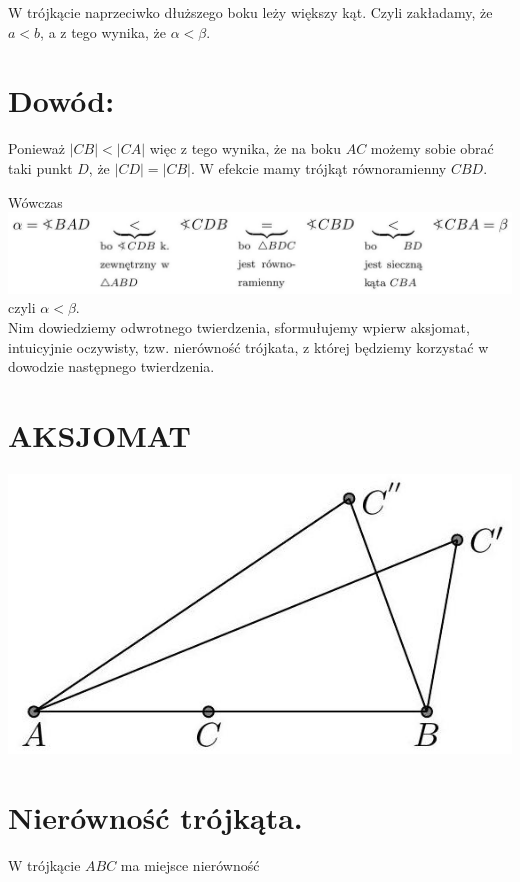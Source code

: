 \documentclass[10pt]{article}
\begin{document}
W trójkącie naprzeciwko dłuższego boku leży większy kąt. Czyli zakładamy, że \(a<b\), a z tego wynika, że \(\alpha<\beta\).

\section*{Dowód:}
Ponieważ \(|C B|<|C A|\) więc z tego wynika, że na boku \(A C\) możemy sobie obrać taki punkt \(D\), że \(|C D|=|C B|\). W efekcie mamy trójkąt równoramienny \(C B D\).

Wówczas\\
\includegraphics[max width=\textwidth, center]{2024_11_21_71f62bd117d375398909g-173(2)}\\
czyli \(\alpha<\beta\).\\
Nim dowiedziemy odwrotnego twierdzenia, sformułujemy wpierw aksjomat, intuicyjnie oczywisty, tzw. nierówność trójkata, z której będziemy korzystać w dowodzie następnego twierdzenia.

\section*{AKSJOMAT}
\begin{center}
\includegraphics[max width=\textwidth]{2024_11_21_71f62bd117d375398909g-173}
\end{center}

\section*{Nierówność trójkąta.}
W trójkącie \(A B C\) ma miejsce nierówność
\end{document}
